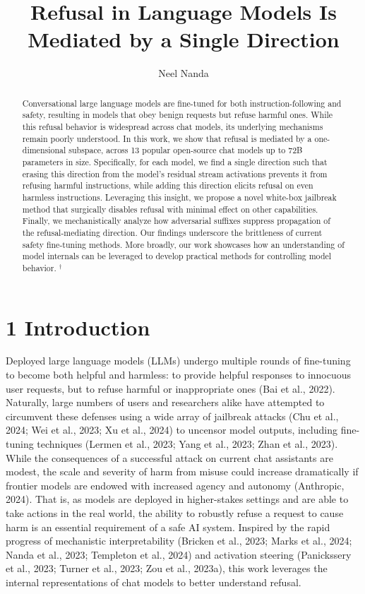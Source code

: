 \documentclass[10pt]{article}
\title{Refusal in Language Models Is Mediated by a Single Direction }
\author{Neel Nanda}
\date{}
\begin{document}
\maketitle
\captionsetup{singlelinecheck=false}


\begin{abstract}
Conversational large language models are fine-tuned for both instruction-following and safety, resulting in models that obey benign requests but refuse harmful ones. While this refusal behavior is widespread across chat models, its underlying mechanisms remain poorly understood. In this work, we show that refusal is mediated by a one-dimensional subspace, across 13 popular open-source chat models up to 72B parameters in size. Specifically, for each model, we find a single direction such that erasing this direction from the model's residual stream activations prevents it from refusing harmful instructions, while adding this direction elicits refusal on even harmless instructions. Leveraging this insight, we propose a novel white-box jailbreak method that surgically disables refusal with minimal effect on other capabilities. Finally, we mechanistically analyze how adversarial suffixes suppress propagation of the refusal-mediating direction. Our findings underscore the brittleness of current safety fine-tuning methods. More broadly, our work showcases how an understanding of model internals can be leveraged to develop practical methods for controlling model behavior. ${ }^{\dagger}$
\end{abstract}

\section*{1 Introduction}
Deployed large language models (LLMs) undergo multiple rounds of fine-tuning to become both helpful and harmless: to provide helpful responses to innocuous user requests, but to refuse harmful or inappropriate ones (Bai et al., 2022). Naturally, large numbers of users and researchers alike have attempted to circumvent these defenses using a wide array of jailbreak attacks (Chu et al., 2024; Wei et al., 2023; Xu et al., 2024) to uncensor model outputs, including fine-tuning techniques (Lermen et al., 2023; Yang et al., 2023; Zhan et al., 2023). While the consequences of a successful attack on current chat assistants are modest, the scale and severity of harm from misuse could increase dramatically if frontier models are endowed with increased agency and autonomy (Anthropic, 2024). That is, as models are deployed in higher-stakes settings and are able to take actions in the real world, the ability to robustly refuse a request to cause harm is an essential requirement of a safe AI system. Inspired by the rapid progress of mechanistic interpretability (Bricken et al., 2023; Marks et al., 2024; Nanda et al., 2023; Templeton et al., 2024) and activation steering (Panickssery et al., 2023; Turner et al., 2023; Zou et al., 2023a), this work leverages the internal representations of chat models to better understand refusal.
\end{document}
